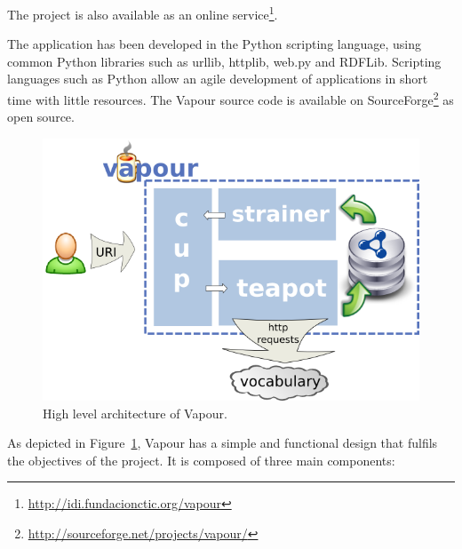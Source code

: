 \documentclass{../templates/llncs}
\begin{document}
The project is also available as an online service\footnote{\url{http://idi.fundacionctic.org/vapour}}.

The application has been developed in the Python scripting language, using common
Python libraries such as urllib, httplib, web.py and RDFLib. Scripting languages such 
as Python allow an agile development of applications in short time with little 
resources. The Vapour source code is available on 
SourceForge\footnote{\url{http://sourceforge.net/projects/vapour/}} 
as open source.

\begin{figure}
 \centering
 \includegraphics[width=12cm]{images/arch.png}
 \caption{\label{fig:arch}High level architecture of Vapour.}
\end{figure}

As depicted in Figure~\ref{fig:arch}, Vapour has a simple and functional
design that fulfils the objectives of the project. It is composed of three
main components:
\end{document}
